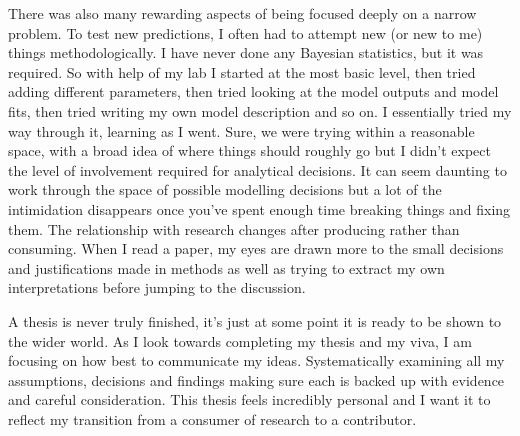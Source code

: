 \documentclass{article}
\begin{document}
There was also many rewarding aspects of being focused deeply on a narrow problem. To test new predictions, I often had to attempt new (or new to me) things methodologically. I have never done any Bayesian statistics, but it was required. So with help of my lab I started at the most basic level, then tried adding different parameters, then tried looking at the model outputs and model fits, then tried writing my own model description and so on. I essentially tried my way through it, learning as I went. Sure, we were trying within a reasonable space, with a broad idea of where things should roughly go but I didn't expect the level of involvement required for analytical decisions. It can seem daunting to work through the space of possible modelling decisions but a lot of the intimidation disappears once you've spent enough time breaking things and fixing them. The relationship with research changes after producing rather than consuming. When I read a paper, my eyes are drawn more to the small decisions and justifications made in methods as well as trying to extract my own interpretations before jumping to the discussion.  

A thesis is never truly finished, it's just at some point it is ready to be shown to the wider world.  As I look towards completing my thesis and my viva, I am focusing on how best to communicate my ideas. Systematically examining all my assumptions, decisions and findings making sure each is backed up with evidence and careful consideration. This thesis feels incredibly personal and I want it to reflect my transition from a consumer of research to a contributor. 
\end{document}
